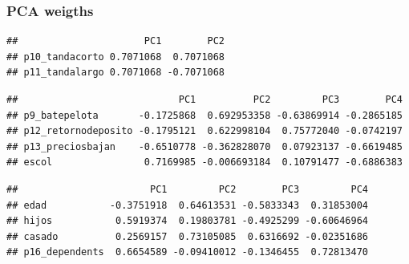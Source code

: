 \documentclass[]{article}
\newenvironment{Shaded}{\begin{snugshade}}{\end{snugshade}}
\newcommand{\OperatorTok}[1]{\textcolor[rgb]{0.81,0.36,0.00}{\textbf{#1}}}
\newcommand{\NormalTok}[1]{#1}
\begin{document}
\subsubsection{PCA weigths}\label{pca-weigths}

\begin{Shaded}
\end{Shaded}

\begin{verbatim}
##                      PC1        PC2
## p10_tandacorto 0.7071068  0.7071068
## p11_tandalargo 0.7071068 -0.7071068
\end{verbatim}

\begin{Shaded}
\end{Shaded}

\begin{verbatim}
##                            PC1          PC2         PC3        PC4
## p9_batepelota       -0.1725868  0.692953358 -0.63869914 -0.2865185
## p12_retornodeposito -0.1795121  0.622998104  0.75772040 -0.0742197
## p13_preciosbajan    -0.6510778 -0.362828070  0.07923137 -0.6619485
## escol                0.7169985 -0.006693184  0.10791477 -0.6886383
\end{verbatim}

\begin{Shaded}
\end{Shaded}

\begin{verbatim}
##                       PC1         PC2        PC3         PC4
## edad           -0.3751918  0.64613531 -0.5833343  0.31853004
## hijos           0.5919374  0.19803781 -0.4925299 -0.60646964
## casado          0.2569157  0.73105085  0.6316692 -0.02351686
## p16_dependents  0.6654589 -0.09410012 -0.1346455  0.72813470
\end{verbatim}

\begin{Shaded}
\end{Shaded}
\end{document}
